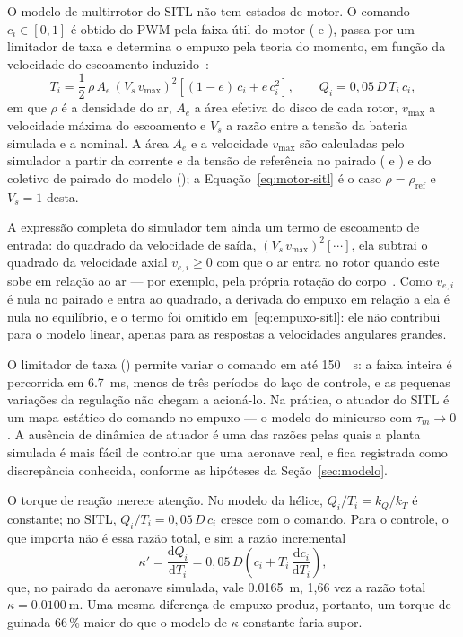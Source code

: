 O modelo de multirrotor do SITL não tem estados de motor. O comando
$c_i \in [0, 1]$ é obtido do PWM pela faixa útil do motor
( e ), passa por um
limitador de taxa e determina o empuxo pela teoria do momento, em função da
velocidade do escoamento induzido~\cite{ardupilot2026}:
\begin{equation}
T_i = \frac{1}{2}\,\rho\,A_e\,\left(V_s\,v_{\max}\right)^2
      \left[(1-e)\,c_i + e\,c_i^2\right],
\qquad
Q_i = 0{,}05\,D\,T_i\,c_i,
\label{eq:empuxo-sitl}
\end{equation}
em que $\rho$ é a densidade do ar, $A_e$ a área efetiva do disco de cada
rotor, $v_{\max}$ a velocidade máxima do escoamento e $V_s$ a razão entre a
tensão da bateria simulada e a nominal. A área $A_e$ e a velocidade $v_{\max}$
são calculadas pelo simulador a partir da corrente e da tensão de referência
no pairado ( e ) e do
coletivo de pairado do modelo (); a
Equação~\eqref{eq:motor-sitl} é o caso $\rho = \rho_{\mathrm{ref}}$ e
$V_s = 1$ desta.

A expressão completa do simulador tem ainda um termo de escoamento de
entrada: do quadrado da velocidade de saída, $(V_s\,v_{\max})^2[\cdots]$, ela
subtrai o quadrado da velocidade axial $v_{e,i} \geq 0$ com que o ar entra no
rotor quando este sobe em relação ao ar --- por exemplo, pela própria rotação
do corpo~\cite{ardupilot2026}. Como $v_{e,i}$ é nula no pairado e entra ao
quadrado, a derivada do empuxo em relação a ela é nula no equilíbrio, e o
termo foi omitido em~\eqref{eq:empuxo-sitl}: ele não contribui para o modelo
linear, apenas para as respostas a velocidades angulares grandes.

O limitador de taxa () permite variar o comando
em até \SI{150}{\per\second}: a faixa inteira é percorrida em
\SI{6.7}{\milli\second}, menos de três períodos do laço de controle, e as
pequenas variações da regulação não chegam a acioná-lo. Na prática, o
atuador do SITL é um mapa estático do comando no empuxo --- o modelo do
minicurso com $\tau_m \to 0$. A ausência de dinâmica de atuador é uma das
razões pelas quais a planta simulada é mais fácil de controlar que uma
aeronave real, e fica registrada como discrepância conhecida, conforme as
hipóteses da Seção~\ref{sec:modelo}.

O torque de reação merece atenção. No modelo da hélice, $Q_i/T_i = k_Q/k_T$
é constante; no SITL, $Q_i/T_i = 0{,}05\,D\,c_i$ cresce com o comando. Para o
controle, o que importa não é essa razão total, e sim a razão incremental
\begin{equation}
\kappa' = \frac{\mathrm{d}Q_i}{\mathrm{d}T_i}
        = 0{,}05\,D\left(c_i + T_i\,\frac{\mathrm{d}c_i}{\mathrm{d}T_i}\right),
\label{eq:kappa-incremental}
\end{equation}
que, no pairado da aeronave simulada, vale \SI{0.0165}{\metre}, 1,66 vez a
razão total $\kappa = \SI{0.0100}{\metre}$. Uma mesma diferença de empuxo
produz, portanto, um torque de guinada 66\,\% maior do que o modelo de
$\kappa$ constante faria supor.

